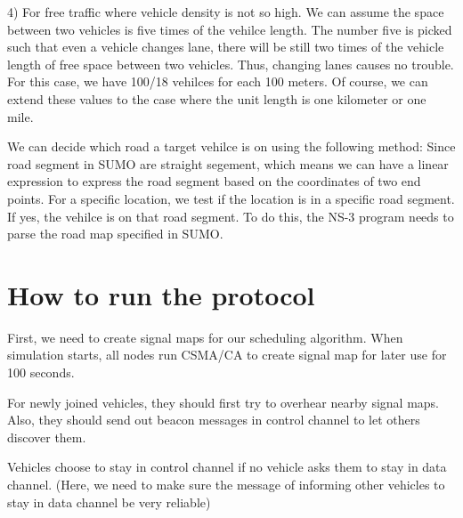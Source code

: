 \documentclass[10pt]{article}
\begin{document}
  4) For free traffic where vehicle density is not so high. We can assume the space between two vehicles is five times of the vehilce length. The number five is picked such that even a vehicle changes lane, there will be still two times of the vehicle length of free space between two vehicles. Thus, changing lanes causes no trouble. For this case, we have 100/18 vehilces for each 100 meters.
  Of course, we can extend these values to the case where the unit length is one kilometer or one mile. 

  We can decide which road a target vehilce is on using the following method: Since road segment in SUMO are straight segement, which means we can have a linear expression to express the road segment based on the coordinates of two end points. For a specific location, we test if the location is in a specific road segment. If yes, the vehilce is on that road segment.  To do this, the NS-3 program needs to parse the road map specified in SUMO.


\section{How to run the protocol}
First, we need to create signal maps for our scheduling algorithm. When simulation starts, all nodes run CSMA/CA to create signal map for later use for 100 seconds.

For newly joined vehicles, they should first try to overhear nearby signal maps. Also, they should send out beacon messages in control channel to let others discover them.

Vehicles choose to stay in control channel if no vehicle asks them to stay in data channel. (Here, we need to make sure the message of informing other vehicles to stay in data channel be very reliable) 
\end{document}
